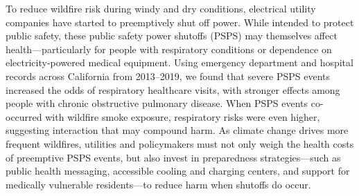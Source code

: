 To reduce wildfire risk during windy and dry conditions, electrical utility companies have started to preemptively shut off power. While intended to protect public safety, these public safety power shutoffs (PSPS) may themselves affect health—particularly for people with respiratory conditions or dependence on electricity-powered medical equipment. Using emergency department and hospital records across California from 2013–2019, we found that severe PSPS events increased the odds of respiratory healthcare visits, with stronger effects among people with chronic obstructive pulmonary disease. When PSPS events co-occurred with wildfire smoke exposure, respiratory risks were even higher, suggesting interaction that may compound harm. As climate change drives more frequent wildfires, utilities and policymakers must not only weigh the health costs of preemptive PSPS events, but also invest in preparedness strategies—such as public health messaging, accessible cooling and charging centers, and support for medically vulnerable residents—to reduce harm when shutoffs do occur.